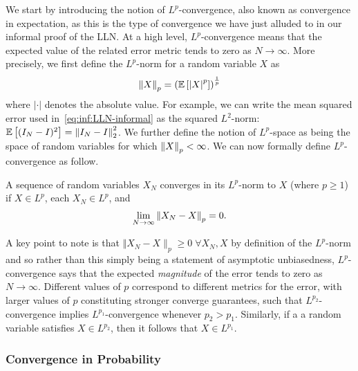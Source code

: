 We start by introducing the notion of $L^p$-convergence, also known as convergence in expectation,
as this is the type of convergence we have just alluded to in our informal proof of the LLN.
At a high level, $L^p$-convergence means that the expected value of the related error metric
tends to zero as $N\rightarrow \infty$.  More precisely, we first define the $L^p$-norm for
a random variable $X$ as
\begin{align}
\label{eq:inf:Lp-norm}
\left\lVert X\right\rVert_p = \left(\mathbb{E} \left[\left|X\right|^{p}\right]\right)^{\frac{1}{p}}
\end{align}
where $\left|\cdot\right|$ denotes the absolute value.  For example, we can write the
mean squared error used in~\eqref{eq:inf:LLN-informal} as the squared $L^2$-norm:
$\mathbb{E} \left[(I_N-I)^2\right] = \left\lVert I_N-I\right\rVert_2^2$.  We further define the notion of $L^p$-space
as being the space of random variables for which $\left\lVert X\right\rVert_p < \infty$.  We can now
formally define $L^p$-convergence as follow.
\begin{definition}[$L^p$-convergence]
A sequence of random variables $X_N$ converges in its $L^p$-norm to 
$X$ (where $p\ge1$) if $X\in L^p$, each $X_N \in L^p$, and
\begin{align}
\lim\limits_{N\rightarrow\infty} \left\lVert X_N-X\right\rVert_p=0. \label{eq:inf:Lp-conv-formal}
\end{align}
\end{definition}
\noindent A key point to note is that $\Vert X_N-X\rVert_p\ge0 \; \forall X_N, X$ by definition of the $L^p$-norm and so
rather than this simply being a statement of asymptotic unbiasedness, $L^p$-convergence says that the expected
\emph{magnitude} of the error tends to zero as $N\rightarrow\infty$.
Different values of $p$ correspond to different metrics for the error, with larger values of
$p$ constituting stronger converge guarantees, such that $L^{p_2}$-convergence implies
$L^{p_1}$-convergence whenever $p_2>p_1$.  Similarly, if a a random variable satisfies
$X \in L^{p_2}$, then it follows that $X \in L^{p_1}$.

%
%

\subsubsection{Convergence in Probability}
\label{sec:inf:mc:conv:prob}

